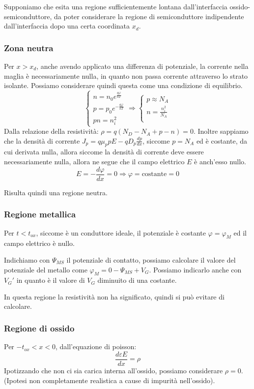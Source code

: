 \documentclass[../template]{subfiles}
\begin{document}
Supponiamo che esita una regione sufficientemente lontana dall'interfaccia ossido-semiconduttore, da poter considerare la regione di semiconduttore indipendente dall'interfaccia dopo una certa coordinata $x_d$.

\subsubsection{Zona neutra}
Per $x > x_d$, anche avendo applicato una differenza di potenziale, la corrente nella maglia è necessariamente nulla, in quanto non passa corrente attraverso lo strato isolante. Possiamo considerare quindi questa come una condizione di equilibrio.
\[
    \begin{cases}
        n = n_0 e^\frac{q \varphi}{kT}\\
        p = p_0 e^{-\frac{q \varphi}{kT}}\\
        pn = n_i^2
    \end{cases} \Rightarrow
    \begin{cases}
        p \approx N_A\\
        n = \frac{n_i^2}{N_A}\\
    \end{cases}
\]
Dalla relazione della resistività: $\rho = q (N_D - N_A + p - n) = 0$.
Inoltre sappiamo che la densità di corrente $J_p = q \mu_p p E - q D_p \frac{dp}{dx}$, siccome $p = N_A$ ed è costante, da cui derivata nulla, allora siccome la densità di corrente deve essere necessariamente nulla, allora ne segue che il campo elettrico $E$ è anch'esso nullo.
\[
    E = -\frac{d \varphi}{dx} = 0 \Rightarrow \varphi = \text{costante} = 0
\]

Risulta quindi una regione neutra.
\subsubsection{Regione metallica}
Per $t < t_{ox}$, siccome è un conduttore ideale, il potenziale è costante $\varphi = \varphi_M$ ed il campo elettrico è nullo.

Indichiamo con $\Psi_{MS}$ il potenziale di contatto, possiamo calcolare il valore del potenziale del metallo come $\varphi_M = 0 - \Psi_{MS} + V_G$. Possiamo indicarlo anche con $V_G'$ in quanto è il valore di $V_G$ diminuito di una costante.

In questa regione la resistività non ha significato, quindi si può evitare di calcolare.

\subsubsection{Regione di ossido}
Per $-t_{ox} < x < 0$, dall'equazione di poisson:
\[
    \frac{d\varepsilon E}{dx} = \rho
\]
Ipotizzando che non ci sia carica interna all'ossido, possiamo considerare $\rho = 0$. (Ipotesi non completamente realistica a cause di impurità nell'ossido).
\end{document}
